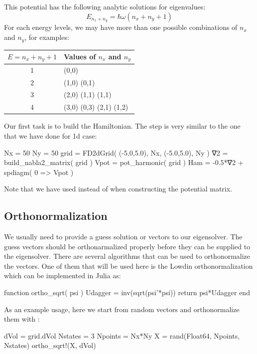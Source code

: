 This potential has the following analytic solutions for eigenvalues:
\begin{equation}
E_{n_{x} + n_{y}} = \hbar \omega \left( n_{x} + n_{y} + 1 \right)
\end{equation}
For each energy levels, we may have more than one possible combinations
of $n_x$ and $n_y$, for examples:

\begin{table}[h]
\centering
\begin{tabular}{|c|l|}
\hline
$E = n_x + n_y + 1$  &  Values of $n_x$ and $n_y$ \\
\hline
1                  &  (0,0) \\
2                  &  (1,0) (0,1) \\
3                  &  (2,0) (1,1) (1,1) \\
4                  &  (3,0) (0,3) (2,1) (1,2) \\
\hline
\end{tabular}
\end{table}

Our first task is to build the Hamiltonian. The step is very similar
to the one that we have done for 1d case:
\begin{juliacode}
Nx = 50
Ny = 50
grid = FD2dGrid( (-5.0,5.0), Nx, (-5.0,5.0), Ny )
∇2 = build_nabla2_matrix( grid )
Vpot = pot_harmonic( grid )
Ham = -0.5*∇2 + spdiagm( 0 => Vpot )
\end{juliacode}
Note that we have used  instead of
 when constructing the potential matrix.

\subsection{Orthonormalization}

We usually need to provide a guess solution or vectors to our eigensolver.
The guess vectors should be orthonarmalized properly before they can be supplied to
the eigensolver. There are several algorithms that can be used to orthonormalize
the vectors. One of them that will be used here is the Lowdin orthonormalization
which can be implemented in Julia as:
\begin{juliacode}
function ortho_sqrt( psi )
  Udagger = inv(sqrt(psi'*psi))
  return psi*Udagger
end
\end{juliacode}

As an example usage, here we start from random vectors and orthonormalize them
with :
\begin{juliacode}
dVol = grid.dVol
Nstates = 3
Npoints = Nx*Ny
X = rand(Float64, Npoints, Nstates)
ortho_sqrt!(X, dVol)
\end{juliacode}

